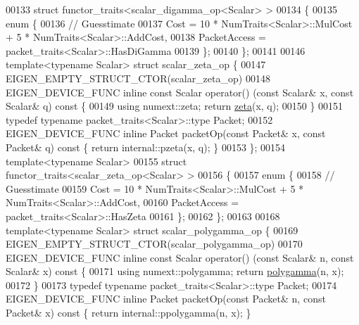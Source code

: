 \begin{DoxyCode}
00133 \textcolor{keyword}{struct }functor\_traits<scalar\_digamma\_op<Scalar> >
00134 \{
00135   \textcolor{keyword}{enum} \{
00136     \textcolor{comment}{// Guesstimate}
00137     Cost = 10 * NumTraits<Scalar>::MulCost + 5 * NumTraits<Scalar>::AddCost,
00138     PacketAccess = packet\_traits<Scalar>::HasDiGamma
00139   \};
00140 \};
00141 
00146 \textcolor{keyword}{template}<\textcolor{keyword}{typename} Scalar> \textcolor{keyword}{struct }scalar\_zeta\_op \{
00147     EIGEN\_EMPTY\_STRUCT\_CTOR(scalar\_zeta\_op)
00148     EIGEN\_DEVICE\_FUNC \textcolor{keyword}{inline} \textcolor{keyword}{const} Scalar operator() (\textcolor{keyword}{const} Scalar& x, \textcolor{keyword}{const} Scalar& q)\textcolor{keyword}{ const }\{
00149         \textcolor{keyword}{using} numext::zeta; \textcolor{keywordflow}{return} \hyperlink{namespace_eigen_af9555e27540da78d2c4bdd17d3b750b1}{zeta}(x, q);
00150     \}
00151     \textcolor{keyword}{typedef} \textcolor{keyword}{typename} packet\_traits<Scalar>::type Packet;
00152     EIGEN\_DEVICE\_FUNC \textcolor{keyword}{inline} Packet packetOp(\textcolor{keyword}{const} Packet& x, \textcolor{keyword}{const} Packet& q)\textcolor{keyword}{ const }\{ \textcolor{keywordflow}{return} 
      internal::pzeta(x, q); \}
00153 \};
00154 \textcolor{keyword}{template}<\textcolor{keyword}{typename} Scalar>
00155 \textcolor{keyword}{struct }functor\_traits<scalar\_zeta\_op<Scalar> >
00156 \{
00157     \textcolor{keyword}{enum} \{
00158         \textcolor{comment}{// Guesstimate}
00159         Cost = 10 * NumTraits<Scalar>::MulCost + 5 * NumTraits<Scalar>::AddCost,
00160         PacketAccess = packet\_traits<Scalar>::HasZeta
00161     \};
00162 \};
00163 
00168 \textcolor{keyword}{template}<\textcolor{keyword}{typename} Scalar> \textcolor{keyword}{struct }scalar\_polygamma\_op \{
00169     EIGEN\_EMPTY\_STRUCT\_CTOR(scalar\_polygamma\_op)
00170     EIGEN\_DEVICE\_FUNC \textcolor{keyword}{inline} \textcolor{keyword}{const} Scalar operator() (\textcolor{keyword}{const} Scalar& n, \textcolor{keyword}{const} Scalar& x)\textcolor{keyword}{ const }\{
00171         \textcolor{keyword}{using} numext::polygamma; \textcolor{keywordflow}{return} \hyperlink{namespace_eigen_ae3b47a13a0699f5dbaa0623c11333dca}{polygamma}(n, x);
00172     \}
00173     \textcolor{keyword}{typedef} \textcolor{keyword}{typename} packet\_traits<Scalar>::type Packet;
00174     EIGEN\_DEVICE\_FUNC \textcolor{keyword}{inline} Packet packetOp(\textcolor{keyword}{const} Packet& n, \textcolor{keyword}{const} Packet& x)\textcolor{keyword}{ const }\{ \textcolor{keywordflow}{return} 
      internal::ppolygamma(n, x); \}

\end{DoxyCode}
